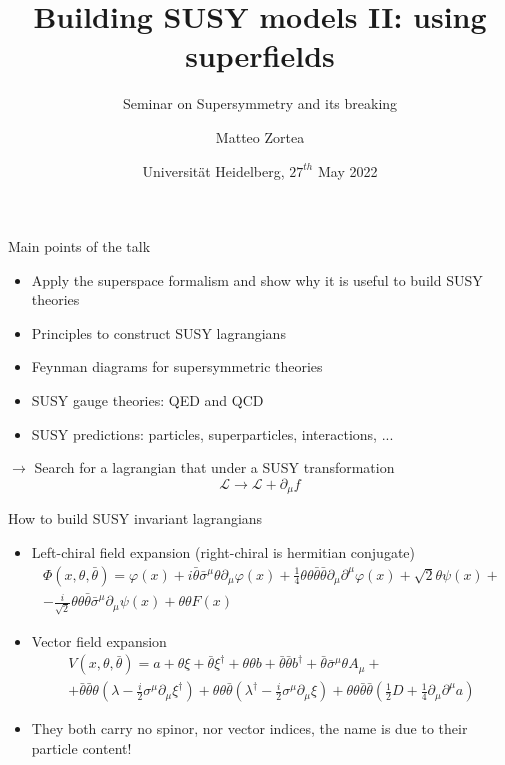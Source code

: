 \documentclass[10pt]{beamer}
\title{Building SUSY models II: using superfields}
\subtitle{Seminar on Supersymmetry and its breaking}
\author{Matteo Zortea}
\date{Universit\"at Heidelberg, $27^{th}$ May 2022}
\institute{Coordinated by prof. Joerg Jaeckel}
\begin{document}
\begin{frame}
\titlepage
\end{frame}

\begin{frame}{Main points of the talk}
\begin{itemize}
    \item Apply the superspace formalism and show why it is useful to build SUSY theories
    \item Principles to construct SUSY lagrangians 
    \item Feynman diagrams for supersymmetric theories
    \item SUSY gauge theories: QED and QCD
    \item SUSY predictions: particles, superparticles, interactions, ...
\end{itemize}
$\rightarrow$ Search for a lagrangian that under a SUSY transformation
\begin{equation*}
    \mathcal{L} \to \mathcal{L} + \partial_\mu f
\end{equation*}
\end{frame}

\begin{frame}{How to build SUSY invariant lagrangians}
    \begin{itemize} 
        \item Left-chiral field expansion (right-chiral is hermitian conjugate)
            \begin{gather*}
                \Phi(x, \theta, \bar\theta) = \varphi(x) + i\bar\theta \bar\sigma^{\mu}\theta \partial_{\mu}\varphi(x) + \frac{1}{4}\theta\theta\bar\theta\bar\theta\partial_{\mu}\partial^{\mu}\varphi(x) + \sqrt{2}\theta\psi(x) + \\ 
                -\frac{i}{\sqrt{2}}\theta\theta\bar\theta\bar\sigma^{\mu}\partial_{\mu}\psi(x) + \theta\theta F(x)
            \end{gather*}
        \item Vector field expansion
            \begin{gather*}
                V\left(x, \theta, \bar\theta\right) = a+\theta \xi+\bar\theta \xi^{\dagger} +\theta \theta b+\bar\theta \bar\theta b^{\dagger}+\bar\theta \bar{\sigma}^{\mu} \theta A_{\mu}+ \\ 
                + \bar\theta \bar\theta \theta\left(\lambda-\frac{i}{2} \sigma^{\mu} \partial_{\mu} \xi^{\dagger}\right)
                +\theta \theta \bar\theta\left(\lambda^{\dagger}-\frac{i}{2} \sigma^{\mu} \partial_{\mu} \xi\right)+\theta \theta \bar\theta \bar\theta \left(\frac{1}{2} D+\frac{1}{4} \partial_{\mu} \partial^{\mu} a\right)
            \end{gather*}
        \item They both carry no spinor, nor vector indices, the name is due to their particle content! 
    \end{itemize}
\end{frame}
\end{document}
